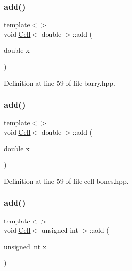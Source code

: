 \mbox{\label{class_cell_a64d4b92f322ccb8cfbad53f816d2caf8}} 
\subsubsection{\texorpdfstring{add()}{add()}\hspace{0.1cm}{\footnotesize\ttfamily [2/9]}}
{\footnotesize\ttfamily template$<$$>$ \\
void \hyperlink{class_cell}{Cell}$<$ double $>$\+::add (\begin{DoxyParamCaption}\item[{double}]{x }\end{DoxyParamCaption})\hspace{0.3cm}{\ttfamily [inline]}}



Definition at line 59 of file barry.\+hpp.

\mbox{\label{class_cell_a64d4b92f322ccb8cfbad53f816d2caf8}} 
\subsubsection{\texorpdfstring{add()}{add()}\hspace{0.1cm}{\footnotesize\ttfamily [3/9]}}
{\footnotesize\ttfamily template$<$$>$ \\
void \hyperlink{class_cell}{Cell}$<$ double $>$\+::add (\begin{DoxyParamCaption}\item[{double}]{x }\end{DoxyParamCaption})\hspace{0.3cm}{\ttfamily [inline]}}



Definition at line 59 of file cell-\/bones.\+hpp.

\mbox{\label{class_cell_ae22060201cf692bbf219827453d0acd2}} 
\subsubsection{\texorpdfstring{add()}{add()}\hspace{0.1cm}{\footnotesize\ttfamily [4/9]}}
{\footnotesize\ttfamily template$<$$>$ \\
void \hyperlink{class_cell}{Cell}$<$ unsigned int $>$\+::add (\begin{DoxyParamCaption}\item[{unsigned int}]{x }\end{DoxyParamCaption})\hspace{0.3cm}{\ttfamily [inline]}}



